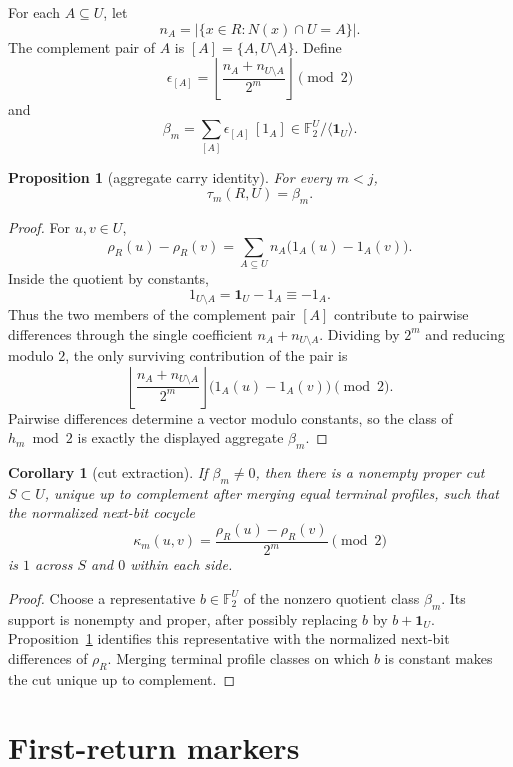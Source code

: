\documentclass[11pt]{article}
\newtheorem{proposition}[theorem]{Proposition}
\newtheorem{corollary}[theorem]{Corollary}
\theoremstyle{remark}
\newcommand{\F}{\mathbb F}
\newcommand{\one}{\mathbf 1}
\begin{document}
For each \(A\subseteq U\), let
\[
  n_A=|\{x\in R:N(x)\cap U=A\}|.
\]
The complement pair of \(A\) is \([A]=\{A,U\setminus A\}\).  Define
\[
  \epsilon_{[A]}
  =\left\lfloor\frac{n_A+n_{U\setminus A}}{2^m}\right\rfloor\pmod 2
\]
and
\[
  \beta_m=\sum_{[A]}\epsilon_{[A]}\,[1_A]
  \in \F_2^U/\langle\one_U\rangle.
\]

\begin{proposition}[aggregate carry identity]\label{prop:beta}
For every \(m<j\),
\[
  \tau_m(R,U)=\beta_m.
\]
\end{proposition}

\begin{proof}
For \(u,v\in U\),
\[
  \rho_R(u)-\rho_R(v)
  =\sum_{A\subseteq U} n_A\bigl(1_A(u)-1_A(v)\bigr).
\]
Inside the quotient by constants,
\[
  1_{U\setminus A}=\one_U-1_A\equiv -1_A.
\]
Thus the two members of the complement pair \([A]\) contribute to pairwise
differences through the single coefficient \(n_A+n_{U\setminus A}\).  Dividing
by \(2^m\) and reducing modulo \(2\), the only surviving contribution of the
pair is
\[
  \left\lfloor\frac{n_A+n_{U\setminus A}}{2^m}\right\rfloor
  \bigl(1_A(u)-1_A(v)\bigr)\pmod 2.
\]
Pairwise differences determine a vector modulo constants, so the class of
\(h_m\bmod2\) is exactly the displayed aggregate \(\beta_m\).
\end{proof}

\begin{corollary}[cut extraction]\label{cor:cut}
If \(\beta_m\ne0\), then there is a nonempty proper cut \(S\subset U\), unique
up to complement after merging equal terminal profiles, such that the normalized
next-bit cocycle
\[
  \kappa_m(u,v)=\frac{\rho_R(u)-\rho_R(v)}{2^m}\pmod 2
\]
is \(1\) across \(S\) and \(0\) within each side.
\end{corollary}

\begin{proof}
Choose a representative \(b\in\F_2^U\) of the nonzero quotient class
\(\beta_m\).  Its support is nonempty and proper, after possibly replacing
\(b\) by \(b+\one_U\).  Proposition~\ref{prop:beta} identifies this
representative with the normalized next-bit differences of \(\rho_R\).  Merging
terminal profile classes on which \(b\) is constant makes the cut unique up to
complement.
\end{proof}

\section{First-return markers}
\end{document}
